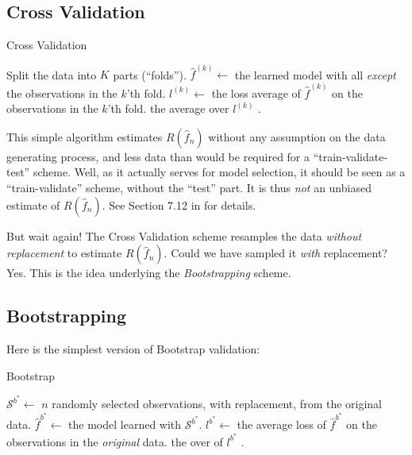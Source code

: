 \documentclass[12pt,a4paper]{article}
\theoremstyle{plain}
\theoremstyle{definition}
\newcommand{\loss}{l}
\newcommand{\risk}{R}
\newcommand{\hyp}{f}
\newcommand{\sample}{\mathcal{S}}
\newcommand{\EPE}{\risk(\hat{\hyp}_n)}
\newcommand{\folds}{K} %
\newcommand{\fold}{k}
\newcommand{\bootstraps}{B} %
\newcommand{\bootstrap}{{b^*}}
\begin{document}
\subsection{Cross Validation}
\label{sec:cv}

\begin{algorithm}[H]
\caption{Cross Validation}
\begin{algorithmic}
\State Split the data into $\folds$ parts (``folds'').
\For {$\fold \in 1,\dots,\folds$}
    \State $\hat{\hyp}^{(k)} \gets$ the learned model with all \emph{except} the observations in the $\fold$'th fold.
    \State $\loss^{(\fold)} \gets$ the loss average of $\hat{\hyp}^{(\fold)}$ on the observations in the $\fold$'th fold.
\EndFor
\State \Return the average over $\loss^{(\fold)}$ .
\end{algorithmic}
\end{algorithm}

This simple algorithm estimates $\EPE$ without any assumption on the data generating process, and less data than would be required for a ``train-validate-test'' scheme.
Well, as it actually serves for model selection, it should be seen as a ``train-validate'' scheme, without the ``test'' part. It is thus \emph{not} an unbiased estimate of $\EPE$. See Section 7.12 in \cite{hastie_elements_2003} for details.

But wait again! 
The Cross Validation scheme resamples the data \emph{without replacement} to estimate $\EPE$. Could we have sampled it \emph{with} replacement? Yes. This is the idea underlying the \emph{Bootstrapping} scheme.


\subsection{Bootstrapping}
\label{sec:bootstrap}

Here is the simplest version of Bootstrap validation:

\begin{algorithm}[H]
\caption{Bootstrap}
\begin{algorithmic}
\For {$\bootstrap \in 1,\dots,\bootstraps$}
	\State $\sample^\bootstrap \gets$ $n$ randomly selected observations, with replacement, from the original data.
    \State $\hat{\hyp}^{\bootstrap} \gets$ the model learned with  $\sample^\bootstrap$.
    \State $\loss^{\bootstrap} \gets$ the average loss of $\hat{\hyp}^{\bootstrap}$ on the observations in the \emph{original} data.
\EndFor
\State \Return the over of $\loss^{\bootstrap}$ .
\end{algorithmic}
\end{algorithm}
\end{document}
